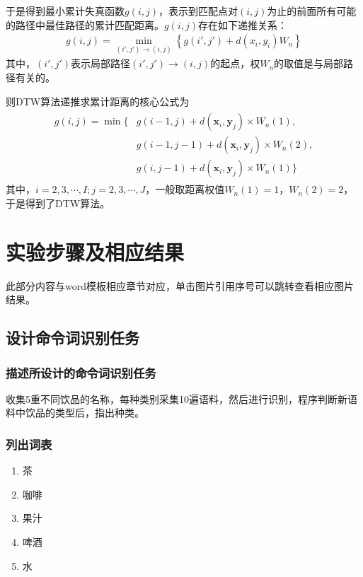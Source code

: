 \documentclass{hitreport}
\begin{document}
于是得到最小累计失真函数$g\left(i,j\right)$，表示到匹配点对$\left(i,j\right)$为止的前面所有可能的路径中最佳路径的累计匹配距离。$g\left(i,j\right)$存在如下递推关系：
\begin{align}
g\left(i,j\right) = \underset{\left(i',j'\right)\rightarrow\left(i,j\right)}{\min}\left\{g\left(i',j'\right)+d\left(x_i,y_i\right)W_n\right\}
\end{align}
其中，$\left(i',j'\right)$表示局部路径$\left(i',j'\right)\rightarrow \left(i,j\right)$的起点，权$W_n$的取值是与局部路径有关的。

则DTW算法递推求累计距离的核心公式为
\begin{align}
\begin{split}
g\left(i,j\right) = \min\{&g\left(i-1,j\right)+d\left(\boldsymbol{x}_i,\boldsymbol{y}_j\right)\times W_n\left(1\right),\\
&g\left(i-1,j-1\right)+d\left(\boldsymbol{x}_i,\boldsymbol{y}_j\right)\times W_n\left(2\right),\\
&g\left(i,j-1\right)+d\left(\boldsymbol{x}_i,\boldsymbol{y}_j\right)\times W_n\left(1\right)\}
\end{split}
\end{align}
其中，$i=2,3,\cdots,I;j=2,3,\cdots,J$，一般取距离权值$W_n\left(1\right) = 1$，$W_n\left(2\right) = 2$，于是得到了DTW算法。


\section{实验步骤及相应结果}

此部分内容与word模板相应章节对应，单击图片引用序号可以跳转查看相应图片结果。

\subsection{设计命令词识别任务}

\subsubsection{描述所设计的命令词识别任务}

收集5重不同饮品的名称，每种类别采集10遍语料，然后进行识别，程序判断新语料中饮品的类型后，指出种类。

\subsubsection{列出词表}

\begin{enumerate}
\item 茶
\item 咖啡
\item 果汁
\item 啤酒
\item 水
\end{enumerate}
\end{document}

